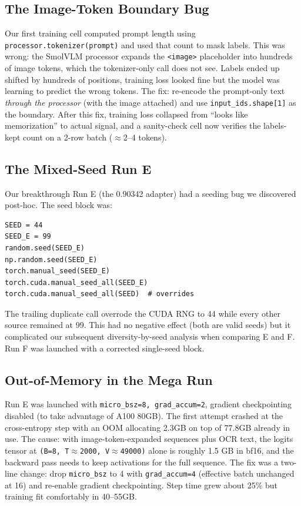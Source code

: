 \documentclass[11pt]{article}
\begin{document}
\subsection{The Image-Token Boundary Bug}
Our first training cell computed prompt length using \texttt{processor.tokenizer(prompt)} and used that count to mask labels. This was wrong: the SmolVLM processor expands the \texttt{<image>} placeholder into hundreds of image tokens, which the tokenizer-only call does not see. Labels ended up shifted by hundreds of positions, training loss looked fine but the model was learning to predict the wrong tokens. The fix: re-encode the prompt-only text \emph{through the processor} (with the image attached) and use \texttt{input\_ids.shape[1]} as the boundary. After this fix, training loss collapsed from ``looks like memorization'' to actual signal, and a sanity-check cell now verifies the labels-kept count on a 2-row batch ($\approx$2--4 tokens).

\subsection{The Mixed-Seed Run E}
Our breakthrough Run E (the 0.90342 adapter) had a seeding bug we discovered post-hoc. The seed block was:
\begin{verbatim}
SEED = 44
SEED_E = 99
random.seed(SEED_E)
np.random.seed(SEED_E)
torch.manual_seed(SEED_E)
torch.cuda.manual_seed_all(SEED_E)
torch.cuda.manual_seed_all(SEED)  # overrides
\end{verbatim}
The trailing duplicate call overrode the CUDA RNG to 44 while every other source remained at 99. This had no negative effect (both are valid seeds) but it complicated our subsequent diversity-by-seed analysis when comparing E and F. Run F was launched with a corrected single-seed block.

\subsection{Out-of-Memory in the Mega Run}
Run E was launched with \texttt{micro\_bsz=8, grad\_accum=2}, gradient checkpointing disabled (to take advantage of A100 80GB). The first attempt crashed at the cross-entropy step with an OOM allocating 2.3GB on top of 77.8GB already in use. The cause: with image-token-expanded sequences plus OCR text, the logits tensor at \texttt{(B=8, T$\approx$2000, V$\approx$49000)} alone is roughly 1.5 GB in bf16, and the backward pass needs to keep activations for the full sequence. The fix was a two-line change: drop \texttt{micro\_bsz} to 4 with \texttt{grad\_accum=4} (effective batch unchanged at 16) and re-enable gradient checkpointing. Step time grew about 25\% but training fit comfortably in 40--55GB.
\end{document}
